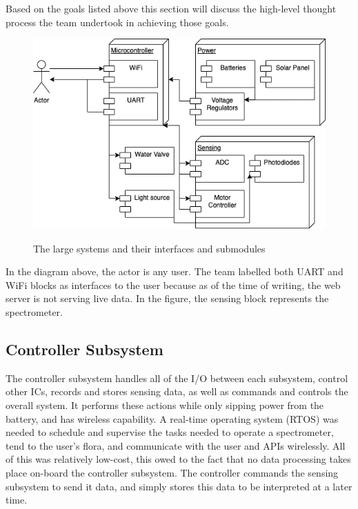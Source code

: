 \documentclass[journal]{IEEEtran}
\begin{document}
Based on the goals listed above this section will discuss the high-level thought
process the team undertook in achieving those goals.
\begin{figure}[H]
	\centering
	\includegraphics[width=\linewidth]{images/Flowchart.png}
	\label{fig:flowchart}
	\caption{The large systems and their interfaces and submodules}
\end{figure}
In the diagram above, the actor is any user. The team labelled both UART and WiFi blocks as interfaces to the user
because as of the time of writing, the web server is not serving live data. In the figure, the sensing block represents the spectrometer.
\subsection{Controller Subsystem}
The controller subsystem handles all of the I/O between each subsystem, control other ICs, records and stores sensing data, as well as commands and controls the overall system. It performs these actions while only sipping power from the battery, and has wireless capability. A real-time operating system (RTOS) was needed to schedule and supervise the tasks needed to operate a spectrometer, tend to the user's flora, and communicate with the user and APIs wirelessly. All of this was relatively low-cost, this owed to the fact that no data processing takes place on-board the controller subsystem. The controller commands the sensing subsystem to send it data, and simply stores this data to be interpreted at a later time.
\end{document}
